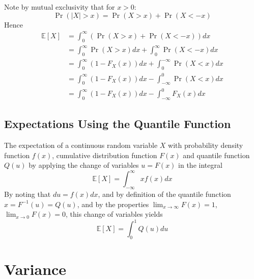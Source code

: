 \documentclass[11pt]{report} %
\begin{document}
Note by mutual exclusivity that for $x > 0$:
\begin{equation}
\operatorname{Pr}\left(\left|X\right| > x\right) = \operatorname{Pr}\left(X > x\right) + \operatorname{Pr}\left(X < -x\right)
\end{equation}
Hence
\begin{align}
\mathbb{E}\left[X\right] &= \int_{0}^{\infty}\left(\operatorname{Pr}\left(X > x\right) + \operatorname{Pr}\left(X < -x\right)\right) dx \\
&= \int_{0}^{\infty}\operatorname{Pr}\left(X > x\right)dx + \int_{0}^{\infty}\operatorname{Pr}\left(X < -x\right) dx \\
&= \int_{0}^{\infty}\left(1 - F_{X}\left(x\right)\right) dx + \int_{0}^{-\infty}\operatorname{Pr}\left(X < x\right) dx \\
&= \int_{0}^{\infty}\left(1 - F_{X}\left(x\right)\right) dx - \int_{-\infty}^{0}\operatorname{Pr}\left(X < x\right) dx \\
&= \int_{0}^{\infty}\left(1 - F_{X}\left(x\right)\right) dx - \int_{-\infty}^{0}F_{X}\left(x\right) dx
\end{align}

\subsection{Expectations Using the Quantile Function}

The expectation of a continuous random variable $X$ with probability density function $f\left(x\right)$, cumulative distribution function $F\left(x\right)$ and quantile function $Q\left(u\right)$ by applying the change of variables $u = F\left(x\right)$ in the integral
\begin{equation}
\mathbb{E}\left[X\right] = \int_{-\infty}^{\infty}xf\left(x\right)dx
\end{equation}
By noting that $du = f\left(x\right)dx$, and by definition of the quantile function $x = F^{-1}\left(u\right) = Q\left(u\right)$, and by the properties $\lim_{x\to\infty}F\left(x\right) = 1$, $\lim_{x\to 0}F\left(x\right) = 0$, this change of variables yields
\begin{equation}
\mathbb{E}\left[X\right] = \int_{0}^{1}Q\left(u\right)du
\end{equation}

\section{Variance}
\end{document}
